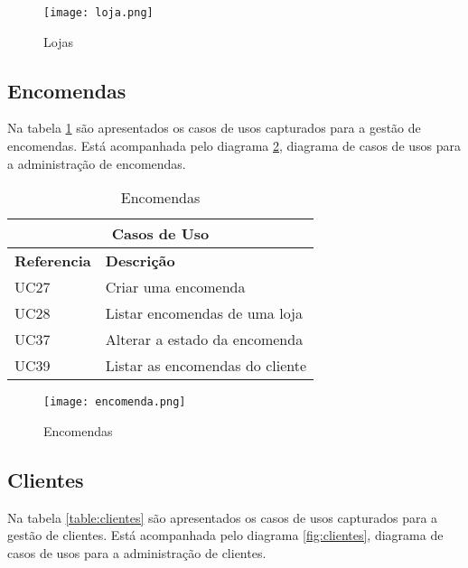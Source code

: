 \begin{figure}[H]
    \centering
    \texttt{[image: loja.png]}
    \caption{Lojas}
    \label{fig:loja}
\end{figure}

\newpage
\subsection{Encomendas}

Na tabela \ref{table:encomendas} são apresentados os casos de usos capturados para a gestão de encomendas. Está acompanhada pelo diagrama \ref{fig:encomendas}, diagrama de casos de usos para a administração de encomendas.

\begin{table}[H]
\caption{Encomendas}
\label{table:encomendas}
\begin{center}
\begin{tabular}{ |p{2cm}|p{10cm}|  }
\hline
\multicolumn{2}{|c|}{Casos de Uso} \\
\hline
\textbf{Referencia} & \textbf{Descrição} \\
\hline
UC27 & Criar uma encomenda\\
\hline
UC28 & Listar encomendas de uma loja\\
\hline
UC37 & Alterar a estado da encomenda\\
\hline
UC39 & Listar as encomendas do cliente\\
\hline
\end{tabular} 
\end{center}
\end{table}

\begin{figure}[H]
    \centering
    \texttt{[image: encomenda.png]}
    \caption{Encomendas}
    \label{fig:encomendas}
\end{figure}

\newpage

\subsection{Clientes}

Na tabela \ref{table:clientes} são apresentados os casos de usos capturados para a gestão de clientes. Está acompanhada pelo diagrama \ref{fig:clientes}, diagrama de casos de usos para a administração de clientes.

